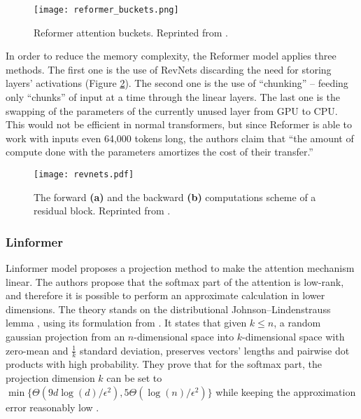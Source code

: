 \begin{figure}[!htb]
        \centering
        \texttt{[image: reformer\_buckets.png]}
        \caption[Reformer Attention Visualization]{Reformer attention buckets. Reprinted from \citep{reformer}.}
        \label{fig:reformer_buckets}
\end{figure}

In order to reduce the memory complexity, the Reformer model applies three methods.
The first one is the use of RevNets \citep{revnets} discarding the need for storing layers' activations (Figure \ref{fig:revnets}). The second one is the use of ``chunking'' -- feeding only ``chunks'' of input at a time through the linear layers.
The last one is the swapping of the parameters of the currently unused layer from GPU to CPU. This would not be efficient in normal transformers, but since Reformer is able to work with inputs even 64,000 tokens long, the authors claim that ``the amount of compute done with the parameters amortizes the cost of their transfer.''

\begin{figure}[!htb]
        \centering
        \texttt{[image: revnets.pdf]}
        \caption[RevNet Scheme]{The forward \textbf{(a)} and the backward \textbf{(b)} computations scheme of a residual block. Reprinted from \citep{revnets}.}
        \label{fig:revnets}
\end{figure}

\subsubsection{Linformer}

Linformer model \citep{linformer} proposes a projection method to make the attention mechanism linear.
The authors propose that the softmax part of the attention is low-rank, and therefore it is possible to perform an approximate calculation in lower dimensions. The theory stands on the distributional
Johnson–Lindenstrauss lemma \citep{JL-lemma}, using its formulation from \citep{JL-formulation}. 
It states that given $k\leq n$, a random gaussian projection from an $n$-dimensional space into $k$-dimensional space with zero-mean and $\frac{1}{k}$ standard deviation, preserves vectors' lengths and pairwise dot products with high probability.
They prove that for the softmax part, the projection dimension $k$ can be set to $\min\{\Theta(9d\log(d)/\epsilon^2),5\Theta(\log(n)/\epsilon^2)\}$ while keeping the approximation error reasonably low \citep[Theorem 2]{linformer}.

